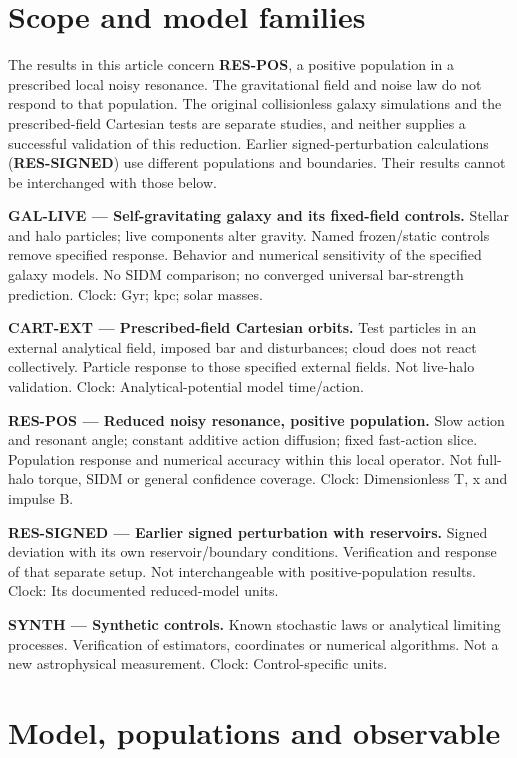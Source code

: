 \documentclass[fleqn,usenatbib]{mnras}
\begin{document}
\section{Scope and model families}\label{models}

The results in this article concern \textbf{RES-POS}, a positive population in a prescribed local noisy resonance. The gravitational field and noise law do not respond to that population. The original collisionless galaxy simulations and the prescribed-field Cartesian tests are separate studies, and neither supplies a successful validation of this reduction. Earlier signed-perturbation calculations (\textbf{RES-SIGNED}) use different populations and boundaries. Their results cannot be interchanged with those below.

\textbf{GAL-LIVE --- Self-gravitating galaxy and its fixed-field controls.} Stellar and halo particles; live components alter gravity. Named frozen/static controls remove specified response. Behavior and numerical sensitivity of the specified galaxy models. No SIDM comparison; no converged universal bar-strength prediction. Clock: Gyr; kpc; solar masses.

\textbf{CART-EXT --- Prescribed-field Cartesian orbits.} Test particles in an external analytical field, imposed bar and disturbances; cloud does not react collectively. Particle response to those specified external fields. Not live-halo validation. Clock: Analytical-potential model time/action.

\textbf{RES-POS --- Reduced noisy resonance, positive population.} Slow action and resonant angle; constant additive action diffusion; fixed fast-action slice. Population response and numerical accuracy within this local operator. Not full-halo torque, SIDM or general confidence coverage. Clock: Dimensionless T, x and impulse B.

\textbf{RES-SIGNED --- Earlier signed perturbation with reservoirs.} Signed deviation with its own reservoir/boundary conditions. Verification and response of that separate setup. Not interchangeable with positive-population results. Clock: Its documented reduced-model units.

\textbf{SYNTH --- Synthetic controls.} Known stochastic laws or analytical limiting processes. Verification of estimators, coordinates or numerical algorithms. Not a new astrophysical measurement. Clock: Control-specific units.

\section{Model, populations and observable}\label{model}
\end{document}
